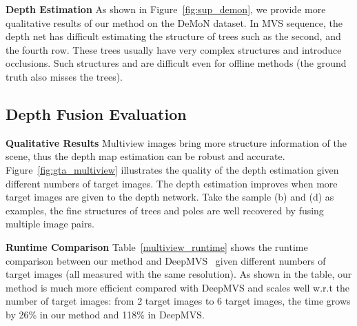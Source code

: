 \documentclass[letterpaper, 10 pt, conference]{ieeeconf}  %
\begin{document}
\begin{table}[h]
\centering
\caption{Camera pose and optical flow estimation quality at different pyramid levels.}
\label{multi_pose}
\end{table}
 
\textbf{Depth Estimation} As shown in Figure~\ref{fig:sup_demon}, we provide more qualitative results of our method on the DeMoN dataset. In MVS sequence, the depth net has difficult estimating the structure of trees such as the second, and the fourth row. These trees usually have very complex structures and introduce occlusions. Such structures and are difficult even for offline methods (the ground truth also misses the trees).
 
\subsection{Depth Fusion Evaluation}
 
\textbf{Qualitative Results} Multiview images bring more structure information of the scene, thus the depth map estimation can be robust and accurate. Figure~\ref{fig:gta_multiview} illustrates the quality of the depth estimation given different numbers of target images. The depth estimation improves when more target images are given to the depth network. Take the sample (b) and (d) as examples, the fine structures of trees and poles are well recovered by fusing multiple image pairs.
 
\textbf{Runtime Comparison} Table~\ref{multiview_runtime} shows the runtime comparison between our method and DeepMVS~\cite{deepmvs} given different numbers of target images (all measured with the same resolution). As shown in the table, our method is much more efficient compared with DeepMVS and scales well w.r.t the number of target images: from 2 target images to 6 target images, the time grows by 26\% in our method and 118\% in DeepMVS.
 
\end{document}
